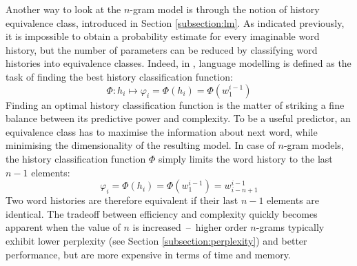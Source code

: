 Another way to look at the \mbox{$n$-gram} model is through the notion of history equivalence class, introduced in Section \ref{subsection:lm}. As indicated previously, it is impossible to obtain a probability estimate for every imaginable word history, but the number of parameters can be reduced by classifying word histories into equivalence classes. Indeed, in \cite{jelinek1997statistical}, language modelling is defined as the task of finding the best history classification function:
\begin{equation}
	\Phi:h_{i}\mapsto\varphi_{i}=\Phi(h_{i})=\Phi(w_{1}^{i-1})
\end{equation}
Finding an optimal history classification function is the matter of striking a fine balance between its predictive power and complexity. To be a useful predictor, an equivalence class has to maximise the information about next word, while minimising the dimensionality of the resulting model. In case of \mbox{$n$-gram} models, the history classification function $\Phi$ simply limits the word history to the last $n-1$ elements:
\begin{equation}
	\varphi_{i}=\Phi(h_{i})=\Phi(w_{1}^{i-1})=w_{i-n+1}^{i-1}
\end{equation}
Two word histories are therefore equivalent if their last $n-1$ elements are identical. The tradeoff between efficiency and complexity quickly becomes apparent when the value of $n$ is increased~--~higher order \mbox{$n$-gram}s typically exhibit lower perplexity (see Section \ref{subsection:perplexity}) and better performance, but are more expensive in terms of time and memory.
